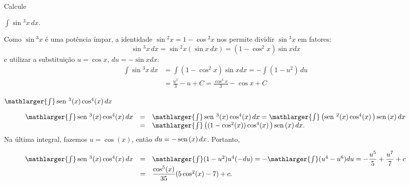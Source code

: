 \cleardoublepage\documentclass[../main.tex]{subfiles}
\begin{document}
\begin{ex}~
 \\  Calcule \\
 \begin{compactenum}
 \item $\int \sin\!\!^3 x\, dx$.
 
    \begin{sol}
      Como $\sin\!\!^3 x$ é uma potência ímpar, a identidade $\sin\!\!^2 x = 1 - \cos\!\!^2 x$ nos permite  dividir  $\sin\!\!^3 x$ em fatores:
      $$\sin\!\!^3 x\, dx=\sin\!\!^2 x(\sin x\,dx)=(1-\cos^2 x)\sin x dx$$
      e utilizar a substituição $u=\cos x$, $du=-\sin x dx$:
      \begin{align*}
          \int \sin\!\!^3 x\, dx&=\int (1-\cos^2 x)\sin x dx=-\int (1-u^2)\, du\\
          &=\frac{u^3}{3}-u+C=\frac{\cos^3 x}{3}-\cos x+C
      \end{align*}
    \end{sol}
 \item \(\mathlarger{\int}\sen^3(x) \cos^4 (x)\,dx\)\\
   
   \begin{solution}
   \[ \begin{array}{rcl} \mathlarger{\int}\sen^3(x) \cos^4 (x)\,dx&=&\mathlarger{\int}\sen^3( x) \cos^4(x)\,dx = \mathlarger{\int}\left(\sen^2 (x) \cos^4( x)\,\right)\sen(x)\,dx\\ & =&\mathlarger{\int}\left((1-\cos^2 (x))\cos^4 (x)\,\right)\sen(x)\,dx. \end{array} \]
Na última integral, fazemos \(u=\cos(x) \), então \(du= - \operatorname{sen}\,(x)\,dx\). Portanto,

\[ \begin{array}{rcl} \mathlarger{\int}\sen^3(x) \cos^4(x)\,dx &=&\mathlarger{\int}(1-u^2)u^4(-du)= -\mathlarger{\int}(u^4-u^6)du=-\dfrac{u^5}{5}+\dfrac{u^7}{7}+c\\ &=& \dfrac{\cos^5(x)}{35}(5\cos^2(x)-7)+c. \end{array} \]
   \end{solution}
 \end{compactenum}
 
 
\end{ex}
\end{document}
